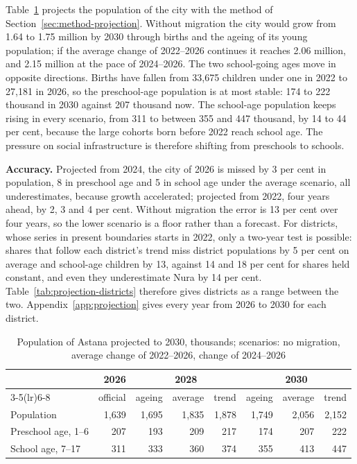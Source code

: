 Table~\ref{tab:projection} projects the population of the city with the method of Section~\ref{sec:method-projection}. Without migration the city would grow from 1.64 to 1.75 million by 2030 through births and the ageing of its young population; if the average change of 2022--2026 continues it reaches 2.06 million, and 2.15 million at the pace of 2024--2026. The two school-going ages move in opposite directions. Births have fallen from 33,675 children under one in 2022 to 27,181 in 2026, so the preschool-age population is at most stable: 174 to 222 thousand in 2030 against 207 thousand now. The school-age population keeps rising in every scenario, from 311 to between 355 and 447 thousand, by 14 to 44 per cent, because the large cohorts born before 2022 reach school age. The pressure on social infrastructure is therefore shifting from preschools to schools.

\textbf{Accuracy.} Projected from 2024, the city of 2026 is missed by 3 per cent in population, 8 in preschool age and 5 in school age under the average scenario, all underestimates, because growth accelerated; projected from 2022, four years ahead, by 2, 3 and 4 per cent. Without migration the error is 13 per cent over four years, so the lower scenario is a floor rather than a forecast. For districts, whose series in present boundaries starts in 2022, only a two-year test is possible: shares that follow each district's trend miss district populations by 5 per cent on average and school-age children by 13, against 14 and 18 per cent for shares held constant, and even they underestimate Nura by 14 per cent. Table~\ref{tab:projection-districts} therefore gives districts as a range between the two. Appendix~\ref{app:projection} gives every year from 2026 to 2030 for each district.

\begin{table}[ht]
\centering
\caption{Population of Astana projected to 2030, thousands; scenarios: no migration, average change of 2022--2026, change of 2024--2026}
\label{tab:projection}
\small
\begin{tabular}{lrrrrrrr}
\toprule
& 2026 & \multicolumn{3}{c}{2028} & \multicolumn{3}{c}{2030} \\
\cmidrule(lr){3-5}\cmidrule(lr){6-8}
& official & ageing & average & trend & ageing & average & trend \\
\midrule
Population & 1,639 & 1,695 & 1,835 & 1,878 & 1,749 & 2,056 & 2,152 \\
Preschool age, 1--6 & 207 & 193 & 209 & 217 & 174 & 207 & 222 \\
School age, 7--17 & 311 & 333 & 360 & 374 & 355 & 413 & 447 \\
\bottomrule
\end{tabular}
\end{table}


